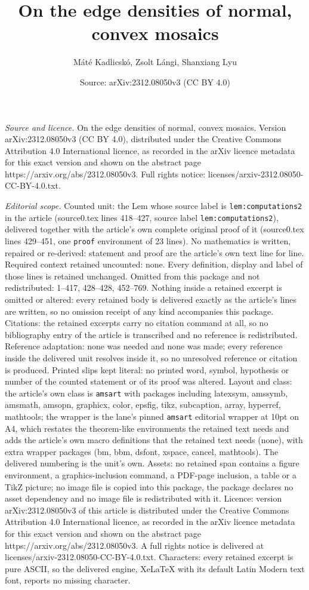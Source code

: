 \documentclass[10pt,a4paper]{amsart}
\title[On the edge densities of normal, convex mosaics]{On the edge densities of normal, convex mosaics}
\author{M\'at\'e Kadlicsk\'o, Zsolt L\'angi, Shanxiang Lyu}
\date{Source: arXiv:2312.08050v3 (CC BY 4.0)}
\begin{document}
\maketitle

\noindent\emph{Source and licence.} On the edge densities of normal, convex mosaics. Version arXiv:2312.08050v3 (CC BY 4.0), distributed under the Creative Commons Attribution 4.0 International licence, as recorded in the arXiv licence metadata for this exact version and shown on the abstract page https://arxiv.org/abs/2312.08050v3. Full rights notice: licenses/arxiv-2312.08050-CC-BY-4.0.txt.\par\smallskip

\noindent\textit{Editorial scope.} Counted unit: the Lem whose source label is \texttt{lem:computations2} in the article (source0.tex lines 418--427, source label \texttt{lem:computations2}), delivered together with the article's own complete original proof of it (source0.tex lines 429--451, one \texttt{proof} environment of 23 lines). No mathematics is written, repaired or re-derived: statement and proof are the article's own text line for line. Required context retained uncounted: none. Every definition, display and label of those lines is retained unchanged. Omitted from this package and not redistributed: 1--417, 428--428, 452--769. Nothing inside a retained excerpt is omitted or altered: every retained body is delivered exactly as the article's lines are written, so no omission receipt of any kind accompanies this package. Citations: the retained excerpts carry no citation command at all, so no bibliography entry of the article is transcribed and no reference is redistributed. Reference adaptation: none was needed and none was made; every reference inside the delivered unit resolves inside it, so no unresolved reference or citation is produced. Printed slips kept literal: no printed word, symbol, hypothesis or number of the counted statement or of its proof was altered. Layout and class: the article's own class is \texttt{amsart} with packages including latexsym, amssymb, amsmath, amsopn, graphicx, color, epsfig, tikz, subcaption, array, hyperref, mathtools; the wrapper is the lane's pinned \texttt{amsart} editorial wrapper at 10pt on A4, which restates the theorem-like environments the retained text needs and adds the article's own macro definitions that the retained text needs (none), with extra wrapper packages (bm, bbm, dsfont, xspace, cancel, mathtools). The delivered numbering is the unit's own. Assets: no retained span contains a figure environment, a graphics-inclusion command, a PDF-page inclusion, a table or a TikZ picture; no image file is copied into this package, the package declares no asset dependency and no image file is redistributed with it. Licence: version arXiv:2312.08050v3 of this article is distributed under the Creative Commons Attribution 4.0 International licence, as recorded in the arXiv licence metadata for this exact version and shown on the abstract page https://arxiv.org/abs/2312.08050v3. A full rights notice is delivered at licenses/arxiv-2312.08050-CC-BY-4.0.txt. Characters: every retained excerpt is pure ASCII, so the delivered engine, XeLaTeX with its default Latin Modern text font, reports no missing character.
\end{document}

